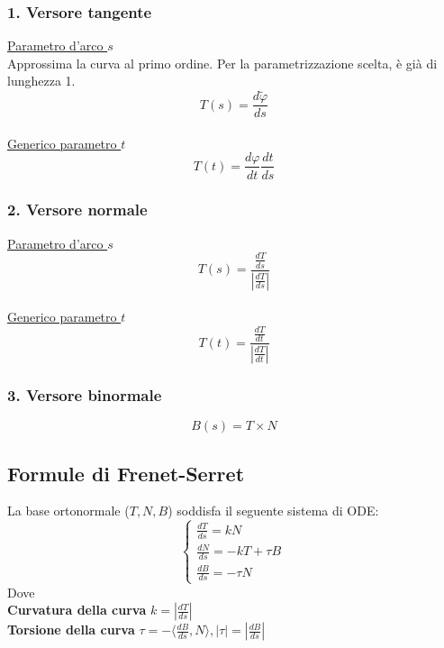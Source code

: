 \documentclass{article} %
\begin{document}
    \subsubsection*{ 1. Versore tangente}
    \underline{Parametro d'arco $s$} \\ Approssima la curva al primo ordine. Per la parametrizzazione scelta, è già di lunghezza 1. $$T(s)=\frac{d\tilde{\varphi}}{ds} $$ \\ \underline{Generico parametro $t$} $$T(t) = \frac{d\varphi}{dt} \frac{dt}{ds}$$

    \subsubsection*{ 2. Versore normale}
    \underline{Parametro d'arco $s$} $$T(s)=\frac{ \frac{dT}{ds}}{ \left| \frac{dT}{ds} \right|} $$ \\ \underline{Generico parametro $t$} $$T(t)=\frac{ \frac{dT}{dt}}{ \left| \frac{dT}{dt} \right|}$$

    \subsubsection*{ 3. Versore binormale}
    $$ B(s) = T \times N $$

    \subsection*{Formule di Frenet-Serret}
    La base ortonormale ($T, N, B$) soddisfa il seguente sistema di ODE:
    \begin{equation}
        \begin{cases}
            \frac{dT}{ds} = k N \\
            \frac{dN}{ds} = -kT + \tau B \\
            \frac{dB}{ds} = - \tau N
        \end{cases}\,
    \end{equation}
    Dove \\ \textbf{Curvatura della curva} $k = \left| \frac{dT}{ds} \right| $ \\ \textbf{Torsione della curva} $ \tau = - \langle \frac{dB}{ds} , N \rangle , | \tau | = | \frac{dB}{ds} |  $
    
\end{document}
